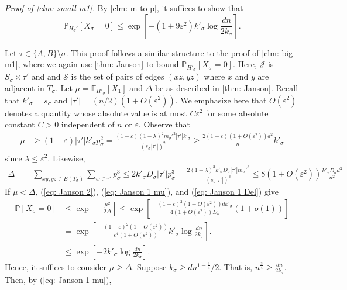 \documentclass[11pt]{article}
\newcommand{\eps}{\varepsilon}
\def\P{\mathbb P}
\theoremstyle{plain}
\begin{document}
\noindent\textit{Proof of \cref{clm: small m1}.} By \cref{clm: m to p}, it suffices to show that 
\[
\P_{H_\sigma'}[X_\sigma = 0] \leq \exp\left[-(1 + 9\eps^2)k'_\sigma\log\frac{dn}{2k_\sigma}\right].
\]
    
    Let $\tau \in \{A, B\} \setminus \sigma$. This proof follows a similar structure to the proof of \cref{clm: big m1}, where we again use \cref{thm: Janson} to bound $\P_{H'_\sigma}[X_\sigma = 0]$. Here, $\mathcal J$ is $S_\sigma \times \tau'$ and and $\mathcal S$ is the set of pairs of edges $(xz,yz)$ where $x$ and $y$ are adjacent in $T_\sigma$. Let $\mu = \mathbb E_{H'_\sigma}[X_1]$ and $\Delta$ be as described in \cref{thm: Janson}. 
    Recall that $k'_\sigma = s_\sigma$ and $|\tau'| = (n/2)(1 + O(\eps^2))$. We emphasize here that $O(\eps^2)$ denotes a quantity whose absolute value is at most $C\eps^2$ for some absolute constant $C>0$ independent of $n$ or $\eps$. Observe that 
    \begin{align}
        \mu &\geq (1 - \varepsilon)|\tau'|k'_\sigma p_\sigma^2 = \frac{(1 - \varepsilon)(1 - \lambda )^2m_\sigma'^2|\tau'|k'_\sigma}{(s_\sigma|\tau'|)^2} \geq \frac{2(1 - \varepsilon)(1 + O(\eps^2))d^2}{n}k'_\sigma\label{eq: Janson 1 mu}
    \end{align}
     since $\lambda  \leq \varepsilon^2$. Likewise, 
    \begin{align}
        \Delta &= \sum_{xy, yz \in E(T_\sigma)}\sum_{w \in \tau'} p_\sigma^3 \leq 2k'_\sigma D_{\sigma}|\tau'|p_\sigma^3 = \frac{2(1 - \lambda )^3k'_\sigma D_{\sigma}|\tau'|m_\sigma'^3}{(s_\sigma|\tau'|)^3}  \leq 8(1 + O(\eps^2))\frac{k'_\sigma D_{\sigma}d^3}{n^2}\label{eq: Janson 1 Del}
    \end{align}
    If $\mu < \Delta$, (\ref{eq: Janson 2}), (\ref{eq: Janson 1 mu}), and (\ref{eq: Janson 1 Del}) give
    \begin{align*}
        \mathbb P[X_\sigma = 0] &\leq \exp\left[ -\frac{\mu^2}{2\Delta} \right] \leq \exp\left[ -\frac{(1 - \varepsilon)^2(1 - O(\varepsilon^2))dk'_\sigma}{4(1 + O(\varepsilon^2))D_{\sigma}} (1 + o(1))\right]\\ 
        &= \exp\left[ -\frac{(1 - \varepsilon)^2(1 - O(\varepsilon^2))}{\varepsilon^{4}(1 + O(\varepsilon^2))}k'_\sigma\log \frac{dn}{2k_\sigma} \right].\\
        &\leq \exp\left[-2k'_\sigma\log\frac{dn}{2k_\sigma}\right]. 
    \end{align*}
    Hence, it suffices to consider $\mu \geq \Delta$. Suppose $k_\sigma\geq dn^{1 - \frac{3}{4}}/2$. That is, $n^{\frac{3}{4}} \geq \frac{dn}{2k_\sigma}$. Then, by (\ref{eq: Janson 1 mu}),
\end{document}
